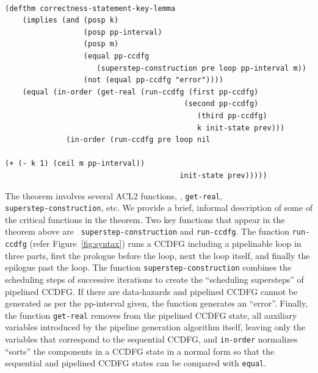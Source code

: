\small
\begin{verbatim}
    
(defthm correctness-statement-key-lemma
    (implies (and (posp k)
                  (posp pp-interval)
                  (posp m)
                  (equal pp-ccdfg 
                     (superstep-construction pre loop pp-interval m))
                  (not (equal pp-ccdfg "error"))))
    (equal (in-order (get-real (run-ccdfg (first pp-ccdfg) 
                                         (second pp-ccdfg) 
                            	            (third pp-ccdfg) 
                            	            k init-state prev)))
              (in-order (run-ccdfg pre loop nil 
								               		                  (+ (- k 1) (ceil m pp-interval)) 
                                 		init-state prev)))))
\end{verbatim}
\normalsize

The theorem involves several ACL2 functions, \eg,
{\tt get-real}, \\ {\tt superstep-construction}, etc. 
We provide a brief, informal
description of some of the critical functions in the theorem.
Two key functions that appear in the theorem above are {\tt
  superstep-construction} and {\tt run-ccdfg}. The function {\tt run-ccdfg} (refer Figure~\ref{fig:syntax}) runs a CCDFG including a
pipelinable loop in three parts, first the prologue before the
loop, next the loop itself, and finally the epilogue past the
loop.
The function {\tt superstep-construction} combines the scheduling steps of successive iterations to create the ``scheduling supersteps'' of pipelined CCDFG.  If there are data-hazards and pipelined CCDFG cannot be generated as per
the pp-interval given, the function generates an ``error''.
Finally, the function {\tt get-real} removes from the
pipelined CCDFG state, all auxiliary variables introduced by
the pipeline generation algorithm itself, leaving only the
variables that correspond to the sequential
CCDFG,
and {\tt in-order} normalizes ``sorts'' the
components in a CCDFG state in a normal form so that the
sequential and pipelined CCDFG states can be compared with
{\tt equal}.

